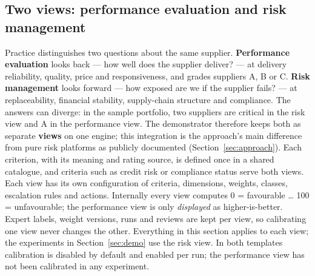 \documentclass[10pt,twocolumn,a4paper]{article}
\begin{document}
\subsection{Two views: performance evaluation and risk management}
\label{sec:views}
Practice distinguishes two questions about the same supplier. \textbf{Performance
evaluation} looks back --- how well does the supplier deliver? --- at delivery
reliability, quality, price and responsiveness, and grades suppliers A, B or C.
\textbf{Risk management} looks forward --- how exposed are we if the supplier fails? ---
at replaceability, financial stability, supply-chain structure and compliance. The
answers can diverge: in the sample portfolio, two suppliers are critical in the risk view
and A in the performance view. The demonstrator therefore keeps both as separate
\textbf{views} on one engine; this integration is the approach's main difference from
pure risk platforms as publicly documented (Section~\ref{sec:approach}). Each criterion, with its meaning and rating source, is
defined once in a shared catalogue, and criteria such as credit risk or compliance status
serve both views. Each view has its own configuration of criteria, dimensions, weights,
classes, escalation rules and actions. Internally every view computes 0 = favourable
\ldots{} 100 = unfavourable; the performance view is only \emph{displayed} as
higher-is-better. Expert labels, weight versions, runs and reviews are kept per view, so
calibrating one view never changes the other. Everything in this section applies to each
view; the experiments in Section~\ref{sec:demo} use the risk view. In both templates
calibration is disabled by default and enabled per run; the performance view has not been
calibrated in any experiment.
\end{document}
